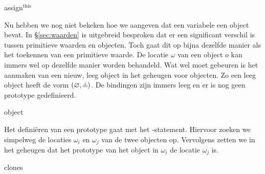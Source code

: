 \begin{NSAxiom}{assign$^\text{this}$}
  \begin{prooftree}
  \end{prooftree}
  \begin{NSConditions}
  \end{NSConditions}
\end{NSAxiom}

Nu hebben we nog niet bekeken hoe we aangeven dat een variabele een object bevat. In §\ref{sec:waarden} is uitgebreid besproken dat er een significant verschil is tussen primitieve waarden en objecten. Toch gaat dit op bijna dezelfde manier als het toekennen van een primitieve waarde. De locatie $\omega$ van een object $o$ kan immers wel op dezelfde manier worden behandeld. Wat wel moet gebeuren is het aanmaken van een nieuw, leeg object in het geheugen voor objecten. Zo een leeg object heeft de vorm $(\varnothing, \nil)$. De bindingen zijn immers leeg en er is nog geen prototype gedefinieerd.

\begin{NSAxiom}{object}
  \begin{prooftree}
  \end{prooftree}
  \begin{NSConditions}
    \Cond{$ \omega = \Nexto(\mo) $}
  \end{NSConditions}
\end{NSAxiom}

Het definiëren van een prototype gaat met het \CLONES-statement. Hiervoor zoeken we simpelweg de locaties $\omega_i$ en $\omega_j$ van de twee objecten op. Vervolgens zetten we in het geheugen dat het prototype van het object in $\omega_i$ de locatie $\omega_j$ is.

\begin{NSAxiom}{clones}
  \begin{prooftree}
  \end{prooftree}
  \begin{NSConditions}
  \end{NSConditions}
\end{NSAxiom}

